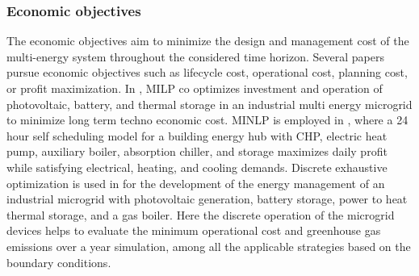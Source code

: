 \documentclass[12pt,a4paper]{report}
\begin{document}
\subsubsection{Economic objectives}
The economic objectives aim to minimize the design and management cost of the multi-energy system throughout the considered time horizon.
Several papers pursue economic objectives such as lifecycle cost, operational cost, planning cost, or profit maximization. In \cite{dangelo2025technoeconomic}, MILP co optimizes investment and operation of photovoltaic, battery, and thermal storage in an industrial multi energy microgrid to minimize long term techno economic cost. %
MINLP is employed in \cite{geramimoghaddam2016comprehensive}, where a 24 hour self scheduling model for a building energy hub with CHP, electric heat pump, auxiliary boiler, absorption chiller, and storage maximizes daily profit while satisfying electrical, heating, and cooling demands.
Discrete exhaustive optimization is used in \cite{dangelo2025modelling} for the development of the energy management of an industrial microgrid with photovoltaic generation, battery storage, power to heat thermal storage, and a gas boiler. Here the discrete operation of the microgrid devices helps to evaluate the minimum operational cost and greenhouse gas emissions over a year simulation, among all the applicable strategies based on the boundary conditions.
\end{document}
